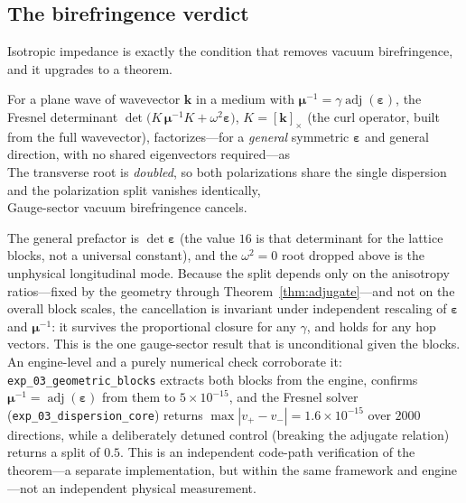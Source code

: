 \subsection{The birefringence verdict}
\label{subsec:birefringence}

Isotropic impedance is exactly the condition that removes vacuum birefringence, and
it upgrades to a theorem.

\begin{theorem}
\label{thm:doubled_root}
For a plane wave of wavevector $\mathbf{k}$ in a medium with
$\boldsymbol{\mu}^{-1} = \gamma\operatorname{adj}(\boldsymbol{\varepsilon})$, the
Fresnel determinant $\det\bigl(K\,\boldsymbol{\mu}^{-1}K + \omega^2
\boldsymbol{\varepsilon}\bigr)$, $K = [\mathbf{k}]_\times$ (the curl operator, built
from the full wavevector), factorizes---for a \emph{general} symmetric
$\boldsymbol{\varepsilon}$ and general direction, with no shared eigenvectors
required---as
\begin{equation}
    \label{eq:dispersion}
    
\end{equation}
The transverse root is \emph{doubled}, so both polarizations share the single
dispersion
\begin{equation}
    \label{eq:shared_dispersion}
    
\end{equation}
and the polarization split vanishes identically,
\begin{equation}
    \label{eq:null_split}
    
\end{equation}
Gauge-sector vacuum birefringence cancels.
\end{theorem}

The general prefactor is $\det\boldsymbol{\varepsilon}$ (the value $16$ is that
determinant for the lattice blocks, not a universal constant), and the $\omega^2=0$
root dropped above is the unphysical longitudinal mode. Because the split depends
only on
the anisotropy ratios---fixed by the geometry through Theorem~\ref{thm:adjugate}---and
not on the overall block scales, the cancellation is invariant under independent
rescaling of $\boldsymbol{\varepsilon}$ and $\boldsymbol{\mu}^{-1}$: it survives the
proportional closure for any $\gamma$, and holds for any hop vectors. This is the one
gauge-sector result that is unconditional given the blocks. An engine-level and a
purely numerical check corroborate it: \texttt{exp\_03\_geometric\_blocks} extracts
both blocks from the engine, confirms $\boldsymbol{\mu}^{-1} =
\operatorname{adj}(\boldsymbol{\varepsilon})$ from them to $5\times10^{-15}$, and the
Fresnel solver (\texttt{exp\_03\_dispersion\_core}) returns $\max|v_+-v_-| =
1.6\times10^{-15}$ over $2000$ directions, while a deliberately detuned control
(breaking the adjugate relation) returns a split of $0.5$. This is an independent
code-path verification of the theorem---a separate implementation, but within the
same framework and engine---not an independent physical measurement.

